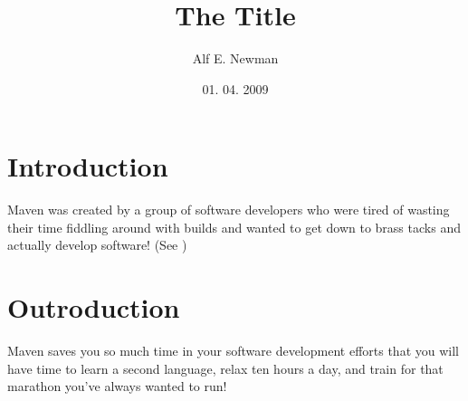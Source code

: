 \documentclass[11pt]{article}
\begin{document}
\title{The Title}
\author{Alf E. Newman}
\date{01. 04. 2009}
\maketitle

\newpage

\tableofcontents

\newpage

\section{Introduction}
Maven was created by a group of software developers 
who were tired of wasting their time 
fiddling around with builds and wanted to get down to brass tacks 
and actually develop software! (See \cite{Massol:2005fy})

\section{Outroduction}

Maven saves you so much time in your software development efforts 
that you will have time to learn a second language, 
relax ten hours a day, and train for that marathon you've always wanted to run!

\newpage 



  
\end{document}
